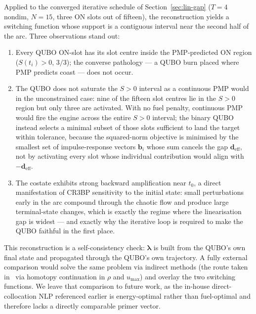 \documentclass[8pt,a4paper]{article}
\newcommand{\bvec}[1]{\bm{#1}}
\theoremstyle{definition}
\theoremstyle{remark}
\begin{document}
Applied to the converged iterative schedule of
Section~\ref{sec:lin-gap} ($T = 4$ nondim, $N = 15$, three ON
slots out of fifteen), the reconstruction yields a switching
function whose support is a contiguous interval near the second
half of the arc. Three observations stand out:
\begin{enumerate}[leftmargin=1.5em]
  \item Every QUBO ON-slot has its slot centre inside the
    PMP-predicted ON region ($S(t_i) > 0$, $3/3$); the converse
    pathology --- a QUBO burn placed where PMP predicts coast ---
    does not occur.
  \item The QUBO does not saturate the $S > 0$ interval as a
    continuous PMP would in the unconstrained case: nine of the
    fifteen slot centres lie in the $S > 0$ region but only three
    are activated. With no fuel penalty, continuous PMP would fire
    the engine across the entire $S > 0$ interval; the binary
    QUBO instead selects a minimal subset of those slots
    sufficient to land the target within tolerance, because the
    squared-norm objective is minimised by the smallest set of
    impulse-response vectors $\bvec{b}_i$ whose sum cancels the
    gap $\bvec{d}_\mathrm{eff}$, not by activating every slot
    whose individual contribution would align with
    $-\bvec{d}_\mathrm{eff}$.
  \item The costate exhibits strong backward amplification near
    $t_0$, a direct manifestation of CR3BP sensitivity to the
    initial state: small perturbations early in the arc compound
    through the chaotic flow and produce large terminal-state
    changes, which is exactly the regime where the linearisation
    gap is widest --- and exactly why the iterative loop is
    required to make the QUBO faithful in the first place.
\end{enumerate}

This reconstruction is a self-consistency check:
$\bvec{\lambda}$ is built from the QUBO's own final state and
propagated through the QUBO's own trajectory. A fully external
comparison would solve the same problem via indirect methods (the
route taken in~\cite{Taylor2026} via homotopy continuation in
$\rho$ and $u_\mathrm{max}$) and overlay the two switching
functions. We leave that comparison to future work, as the
in-house direct-collocation NLP referenced earlier is
energy-optimal rather than fuel-optimal and therefore lacks a
directly comparable primer vector.

\end{document}
